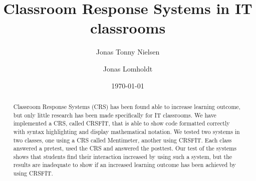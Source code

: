 \documentclass{article}
\title{Classroom Response Systems in IT classrooms}
\author{Jonas Tonny Nielsen \and Jonas Lomholdt}
\date{\today}
\begin{document}
\maketitle

\begin{abstract}
Classroom Response Systems (CRS) has been found able to increase learning outcome, but only little research has been made specifically for IT classrooms. We have implemented a CRS, called CRSFIT, that is able to show code formatted correctly with syntax highlighting and display mathematical notation. We tested two systems in two classes, one using a CRS called Mentimeter, another using CRSFIT. Each class answered a pretest, used the CRS and answered the posttest. Our test of the systems shows that students find their interaction increased by using such a system, but the results are inadequate to show if an increased learning outcome has been achieved by using CRSFIT.
\end{abstract}

\tableofcontents

\clearpage
\listoffigures

\listoftables

\lstlistoflistings


\clearpage
 \clearpage

 \clearpage
 \clearpage
 \clearpage
 \clearpage
 \clearpage
 \clearpage



\clearpage

\end{document}
